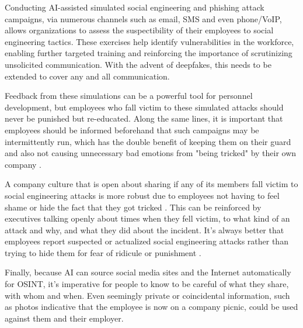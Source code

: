 Conducting AI-assisted simulated social engineering and phishing attack campaigns, via numerous channels such as email, SMS and even phone/VoIP, allows organizations to assess the suspectibility of their employees to social engineering tactics. These exercises help identify vulnerabilities in the workforce, enabling further targeted training and reinforcing the importance of scrutinizing unsolicited communication. With the advent of deepfakes, this needs to be extended to cover any and all communication.

Feedback from these simulations can be a powerful tool for personnel development, but employees who fall victim to these simulated attacks should never be punished but re-educated. Along the same lines, it is important that employees should be informed beforehand that such campaigns may be intermittently run, which has the double benefit of keeping them on their guard and also not causing unnecessary bad emotions from "being tricked" by their own company \citep{hadnagySocialEngineering2018, mitnickArtDeceptionControlling2003}.

A company culture that is open about sharing if any of its members fall victim to social engineering attacks is more robust due to employees not having to feel shame or hide the fact that they got tricked \citep{hadnagySocialEngineering2018}. This can be reinforced by executives talking openly about times when they fell victim, to what kind of an attack and why, and what they did about the incident. It's always better that employees report suspected or actualized social engineering attacks rather than trying to hide them for fear of ridicule or punishment \citep{mitnickArtDeceptionControlling2003}.


Finally, because AI can source social media sites and the Internet automatically for OSINT, it's imperative for people to know to be careful of what they share, with whom and when. Even seemingly private or coincidental information, such as photos indicative that the employee is now on a company picnic, could be used against them and their employer.